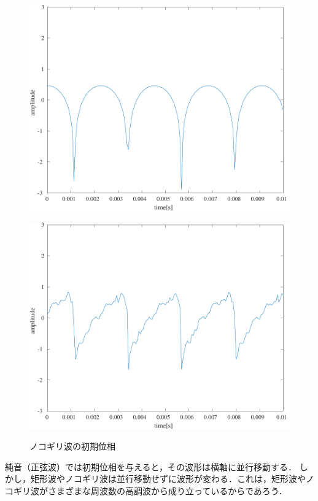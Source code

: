 \begin{figure}[H]
\begin{minipage}{.24\textwidth}
    \end{minipage}
    \begin{minipage}{.24\textwidth}
        \centering
        \label{fig:実験結果ノコギリ波_p2PI}
        \includegraphics[keepaspectratio,width=\textwidth]{../../Figures/03_23.pdf}
    \end{minipage}
    \begin{minipage}{.24\textwidth}
        \centering
        \label{fig:実験結果ノコギリ波_rand}
        \includegraphics[keepaspectratio,width=\textwidth]{../../Figures/03_24.pdf}
    \end{minipage}
    \caption{ノコギリ波の初期位相}
    \label{fig:ノコギリ波の初期位相}
\end{figure}
\consideration
純音（正弦波）では初期位相を与えると，その波形は横軸に並行移動する．
しかし，矩形波やノコギリ波は並行移動せずに波形が変わる．これは，矩形波やノコギリ波がさまざまな周波数の高調波から成り立っているからであろう．
